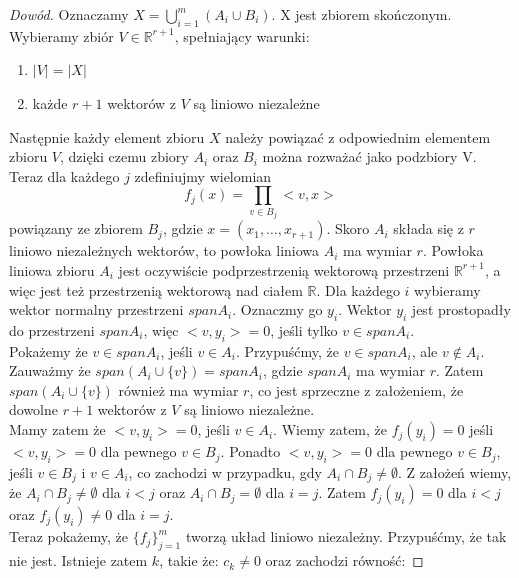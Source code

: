 \documentclass[12pt,a4paper]{article}
\begin{document}
\begin{proof}[Dow\'od]\cite{3}
Oznaczamy $X=\bigcup_{i=1}^{m} (A_i \cup B_{i})$. X jest zbiorem sko\'nczonym. Wybieramy zbi\'or $V\in\mathbb{R}^{r+1}$, spe{\l}niaj\k{a}cy warunki: 
\begin{enumerate}[1)]
\item $|V|=|X|$ 
\item ka\.zde $r+1$ wektor\'ow z $V$ s\k{a} liniowo niezale\.zne
\end{enumerate}
 Nast\k{e}pnie ka\.zdy element zbioru $X$ nale\.zy powi\k{a}za\'c z odpowiednim elementem zbioru $V$, dzi\k{e}ki czemu zbiory $A_{i}$ oraz $B_{i}$ mo\.zna rozwa\.za\'c jako podzbiory V. Teraz dla ka\.zdego $j$ zdefiniujmy wielomian 
\begin{equation}
f_{j}(x)=\prod_{v\in B_{j}}<v,x> 
\end{equation}
 powi\k{a}zany ze zbiorem $B_{j}$, gdzie $x=(x_{1},\ldots,x_{r+1})$. Skoro $A_{i}$ sk{\l}ada si\k{e} z $r$ liniowo niezale\.znych wektor\'ow, to pow{\l}oka liniowa $A_{i}$ ma wymiar $r$. Pow{\l}oka liniowa zbioru $A_{i}$ jest oczywi\'scie podprzestrzeni\k{a} wektorow\k{a} przestrzeni $\mathbb{R}^{r+1}$, a wi\k{e}c jest te\.z przestrzeni\k{a} wektorow\k{a} nad cia{\l}em $\mathbb{R}$.  Dla ka\.zdego $i$ wybieramy wektor normalny przestrzeni $spanA_{i}$. Oznaczmy go $y_{i}$. Wektor $y_{i}$ jest prostopad{\l}y do przestrzeni $spanA_{i}$, wi\k{e}c $<v,y_{i}>=0$, je\'sli tylko $v\in spanA_{i}$.\\ 
Poka\.zemy \.ze $v\in spanA_{i}$, je\'sli $v\in A_{i}$. Przypu\'s\'cmy, \.ze $v\in spanA_{i}$, ale $v\notin A_{i}$. Zauwa\.zmy \.ze $span(A_{i}\cup\{v\})=spanA_{i}$, gdzie $spanA_{i}$ ma wymiar $r$. Zatem $span(A_{i}\cup\{v\})$ r\'ownie\.z ma wymiar $r$, co jest sprzeczne z za{\l}o\.zeniem, \.ze dowolne $r+1$ wektor\'ow z $V$ s\k{a} liniowo niezale\.zne. \\
Mamy zatem \.ze $<v,y_{i}>=0$, je\'sli $v\in A_{i}$. Wiemy zatem, \.ze $f_j(y_{i})=0$ je\'sli $<v,y_{i}>=0$ dla pewnego $v\in B_{j}$. Ponadto $<v,y_{i}>=0$ dla pewnego $v\in B_{j}$, je\'sli $v\in B_{j}$ i $v\in A_{i}$, co zachodzi w przypadku, gdy $A_{i}\cap B_{j}\neq\emptyset$. Z za{\l}o\.ze\'n wiemy, \.ze $A_{i}\cap B_{j}\neq\emptyset$ dla $i<j$ oraz $A_{i}\cap B_{j}=\emptyset$ dla $i=j$. Zatem $f_{j}(y_{i})=0$ dla $i<j$ oraz $f_{j}(y_{i})\neq0$ dla $i=j$. \\
Teraz poka\.zemy, \.ze $\{f_{j}\}_{j=1}^{m}$ tworz\k{a} uk{\l}ad liniowo niezale\.zny. Przypu\'s\'cmy, \.ze tak nie jest. Istnieje zatem $k$, takie \.ze: $c_{k}\neq0$ oraz zachodzi r\'owno\'s\'c: 

\end{proof}
\end{document}
